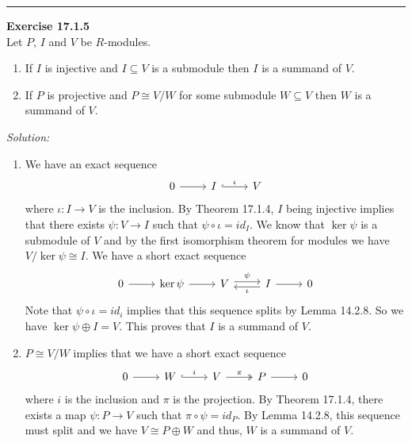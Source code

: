 \documentclass[a4paper, 12pt]{article}
\newenvironment{problem}[2][Exercise]
    { \begin{mdframed}[backgroundcolor=gray!20] \textbf{#1 #2} \\}
    {  \end{mdframed}}
\newenvironment{solution}
    {\textit{Solution:}}
    {}
\begin{document}
\noindent\rule{7in}{2.8pt}
\begin{problem}{17.1.5}
Let \(P\), \(I\) and \(V\) be \(R\)-modules.
\begin{enumerate}[(1)]
\item If \(I\) is injective and \(I\subseteq V\) is a submodule then \(I\) is a summand of \(V\). 
\item If \(P\) is projective and \(P\cong V/W\) for some submodule \(W\subseteq V\) then \(W\) is a summand of \(V\).
\end{enumerate}
\end{problem}
\begin{solution}
\begin{enumerate}[(1)]
\item We have an exact sequence 
\[\begin{tikzcd}
	0 & I & V
	\arrow[from=1-1, to=1-2]
	\arrow["\iota", hook, from=1-2, to=1-3]
\end{tikzcd}\]
where \(\iota:I\rightarrow V\) is the inclusion. By Theorem 17.1.4, \(I\) being injective implies that there exists \(\psi:V\rightarrow I\) such that \(\psi\circ \iota=id_I\). We know that 
\(\ker \psi\) is a submodule of \(V\) and by the first isomorphism theorem for modules we have \(V/\ker \psi\cong I\). We have a short exact sequence 
\[\begin{tikzcd}
	0 & {\ker\psi} & V & I & 0
	\arrow[from=1-1, to=1-2]
	\arrow[from=1-2, to=1-3]
	\arrow["\psi", shift left, from=1-3, to=1-4]
	\arrow["\iota", shift left, from=1-4, to=1-3]
	\arrow[from=1-4, to=1-5]
\end{tikzcd}\]
Note that \(\psi\circ \iota=id_i\) implies that this sequence splits by Lemma 14.2.8. So we have \(\ker\psi\oplus I=V\). This proves that \(I\) is a summand of \(V\).
\item \(P\cong V/W\) implies that we have a short exact sequence 
\[\begin{tikzcd}
	0 & W & V & P & 0
	\arrow[from=1-1, to=1-2]
	\arrow["i", hook, from=1-2, to=1-3]
	\arrow["\pi", two heads, from=1-3, to=1-4]
	\arrow[from=1-4, to=1-5]
\end{tikzcd}\]
where \(i\) is the inclusion and \(\pi\) is the projection. By Theorem 17.1.4, there exists a map \(\psi:P\rightarrow V\) such that \(\pi\circ \psi=id_P\). By Lemma 14.2.8, this sequence must split and we have 
\(V\cong P\oplus W\) and thus, \(W\) is a summand of \(V\).
\end{enumerate} 
\end{solution}
\end{document}
